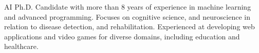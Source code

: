 \documentclass[10pt,a4paper,ragged2e,withhyper]{altacv}
\begin{document}

\makecvheader




{\justifying \noindent AI Ph.D. Candidate with more than 8 years of experience in machine learning and advanced programming. Focuses on cognitive science, and neuroscience in relation to  disease detection, and rehabilitation. Experienced at developing web applications and video games for diverse domains, including education and healthcare. \par}
\medskip
\end{document}
